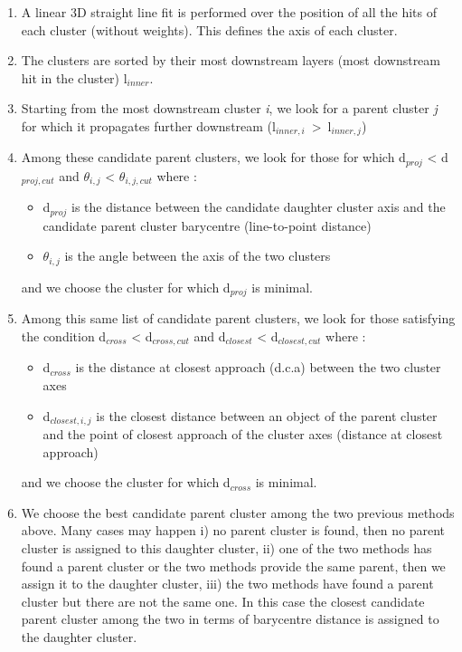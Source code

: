 \documentclass[cits]{JINST}
\begin{document}
\begin{enumerate}
  \item A linear 3D straight line fit is performed over the position of all the hits of each cluster (without weights). This defines the axis of each cluster.
  \item The clusters are sorted by their most downstream layers (most downstream hit in the cluster) l$_{inner}$.
  \item Starting from the most downstream cluster \textit{i}, we look for a parent cluster \textit{j} for which it propagates further downstream (l$_{inner,i}$~>~l$_{inner,j}$)
  \item Among these candidate parent clusters, we look for those for which d$_{proj}$ < d$_{proj,cut}$ and $\theta_{i,j}$ < $\theta_{i,j,cut}$  where :
  \begin{itemize}
    \item d$_{proj}$ is the distance between the candidate daughter cluster axis and the candidate parent cluster barycentre (line-to-point distance)
    \item $\theta_{i,j}$ is the angle between the axis of the two clusters
  \end{itemize}
  and we choose the cluster for which d$_{proj}$ is minimal.  
  \item Among this same list of candidate parent clusters, we look for those satisfying the condition d$_{cross}$ < d$_{cross,cut}$ and d$_{closest}$ < d$_{closest,cut}$ where :
  \begin{itemize}
    \item d$_{cross}$ is the distance at closest approach (d.c.a) between the two cluster axes
    \item d$_{closest,i,j}$ is the closest distance between an object of the parent cluster and the point of closest approach of the cluster axes (distance at closest approach)
  \end{itemize}
  and we choose the cluster for which d$_{cross}$ is minimal.
  \item We choose the best candidate parent cluster among the two previous methods above. Many cases may happen i) no parent cluster is found, then no parent cluster is assigned to this daughter cluster, ii) one of the two methods has found a parent cluster or the two methods provide the same parent, then we assign it to the daughter cluster, iii) the two methods have found a parent cluster but there are not the same one. In this case the closest candidate parent cluster among the two in terms of barycentre distance is assigned to the daughter cluster.

\end{enumerate}
\end{document}
